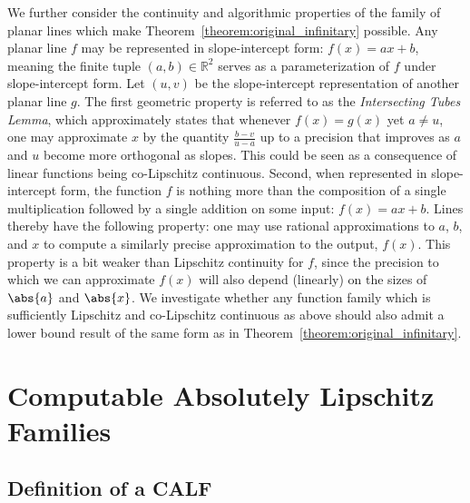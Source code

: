 We further consider the continuity and algorithmic properties of the family of planar lines which make Theorem~\ref{theorem:original_infinitary} possible.  Any planar line $f$ may be represented in slope-intercept form: $f(x) = ax + b$, meaning the finite tuple $(a, b) \in \mathbb{R}^2$ serves as a parameterization of $f$ under slope-intercept form. Let $(u, v)$ be the slope-intercept representation of another planar line $g$. The first geometric property is referred to as the \textit{Intersecting Tubes Lemma}, which approximately states that whenever $f(x) = g(x)$ yet $a \neq u$, one may approximate $x$ by the quantity $\frac{b - v}{u - a}$ up to a precision that improves as $a$ and $u$ become more orthogonal as slopes. This could be seen as a consequence of linear functions being co-Lipschitz continuous. Second, when represented in slope-intercept form, the function $f$ is nothing more than the composition of a single multiplication followed by a single addition on some input: $f(x) = ax + b$. Lines thereby have the following property: one may use rational approximations to $a$, $b$, and $x$ to compute a similarly precise approximation to the output, $f(x)$. This property is a bit weaker than Lipschitz continuity for $f$, since the precision to which we can approximate $f(x)$ will also depend (linearly) on the sizes of $\abs{a}$ and $\abs{x}$. We investigate whether any function family which is sufficiently Lipschitz and co-Lipschitz continuous as above should also admit a lower bound result of the same form as in Theorem~\ref{theorem:original_infinitary}. 


\section{Computable Absolutely Lipschitz Families}

\label{section:CALF}

\subsection{Definition of a CALF}

